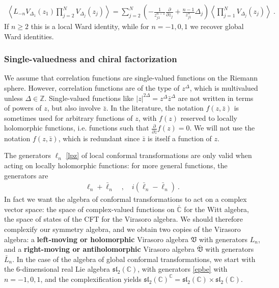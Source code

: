 \documentclass[12pt, a4paper]{article}
\theoremstyle{break}
\begin{document}
\begin{align}
 \left<L_{-n}V_{\Delta_1}(z_1)\prod_{j=2}^N V_{\Delta_j}(z_j)\right> = \sum_{j=2}^N \left(-\frac{1}{z_{j1}^{n-1}}\frac{\partial}{\partial z_j} +\frac{n-1}{z_{j1}^n} \Delta_j\right) \left<\prod_{j=1}^N V_{\Delta_j}(z_j)\right>\ . 
 \label{lwi}
\end{align}
If $n\geq 2$ this is a local Ward identity, while for $n=-1,0,1$ we recover global Ward identities. 

\subsubsection{Single-valuedness and chiral factorization}

We assume that correlation functions are single-valued functions on the Riemann sphere. However, correlation functions are of the type of $z^\Delta$, which is multivalued unless $\Delta\in\mathbb{Z}$. Single-valued functions like $|z|^{2\Delta}=z^\Delta\bar{z}^\Delta$ are not written in terms of powers of $z$, but also involve $\bar z$. In the literature, the notation $f(z,\bar z)$ is sometimes used for arbitrary functions of $z$, with $f(z)$ reserved to locally holomorphic functions, i.e. functions such that $\frac{\partial}{\partial \bar z} f(z) =0$. We will not use the notation $f(z,\bar z)$, which is redundant since $\bar z$ is itself a function of $z$. 

The generators $\ell_n$ \eqref{lpz} of local conformal transformations are only valid when acting on locally holomorphic functions: for more general functions, the generators are 
\begin{align}
 \ell_n +\bar{\ell}_n \quad , \quad i(\bar\ell_n -\bar \ell_n)\  .
 \label{epbe}
\end{align}
In fact we want the algebra of conformal transformations to act on a complex vector space: the space of complex-valued functions on $\overline{\mathbb{C}}$ for the Witt algebra, the space of states of the CFT for the Virasoro algebra. We should therefore complexify our symmetry algebra, and we obtain two copies of the Virasoro algebra: a \textbf{left-moving or holomorphic} Virasoro algebra $\mathfrak{V}$ with generators $L_n$, and a \textbf{right-moving or antiholomorphic} Virasoro algebra $\bar{\mathfrak{V}}$ with generators $\bar{L}_n$. In the case of the algebra of global conformal transformations, we start with the 6-dimensional real Lie algebra $\mathfrak{sl}_2(\mathbb{C})$, with generators \eqref{epbe} with $n=-1,0,1$, and the complexification yields $\mathfrak{sl}_2(\mathbb{C})^\mathbb{C} = \mathfrak{sl}_2(\mathbb{C})\times \mathfrak{sl}_2(\mathbb{C})$.
\end{document}
